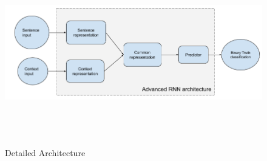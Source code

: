 \documentclass[a4paper, 11pt]{article}
\begin{document}
\begin{figure}[htpb]
    \centering
    \includegraphics[width=\textwidth,height=8cm,keepaspectratio=true]
    {detailed-architecture-diagram.png}
    \caption{
        Detailed Architecture
    }
    \label{fig:detailed_architecture}
\end{figure}
\end{document}

